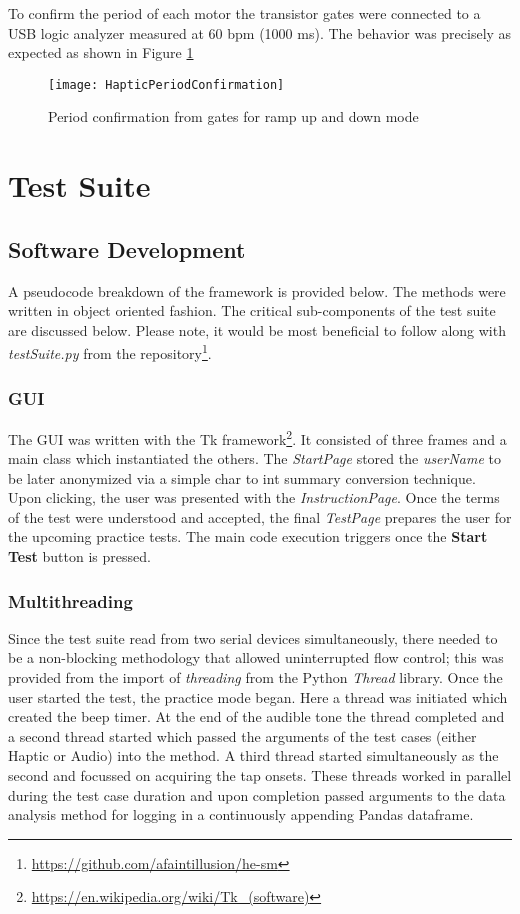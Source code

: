 To confirm the period of each motor the transistor gates were connected to a USB logic analyzer measured at 60 bpm (1000 ms). The behavior was precisely as expected as shown in Figure \ref{fig:HPC}
\begin{figure}[H]
    \centering
    \texttt{[image: HapticPeriodConfirmation]}
    \caption{Period confirmation from gates for ramp up and down mode}
    \label{fig:HPC}
\end{figure}

\chapter{Test Suite}
\section{Software Development} \label{development}
A pseudocode breakdown of the framework is provided below. The methods were written in object oriented fashion. The critical sub-components of the test suite are discussed below. Please note, it would be most beneficial to follow along with \textit{testSuite.py} from the repository\footnote{\url{https://github.com/afaintillusion/he-sm}}.

\subsection{GUI}
The GUI was written with the Tk framework\footnote{\url{https://en.wikipedia.org/wiki/Tk_(software)}}. It consisted of three frames and a main class which instantiated the others. The \textit{StartPage} stored the \textit{userName} to be later anonymized via a simple char to int summary conversion technique. Upon clicking, the user was presented with the \textit{InstructionPage}. Once the terms of the test were understood and accepted, the final \textit{TestPage} prepares the user for the upcoming practice tests. The main code execution triggers once the \textbf{Start Test} button is pressed.
\subsection{Multithreading}
Since the test suite read from two serial devices simultaneously, there needed to be a non-blocking methodology that allowed uninterrupted flow control; this was provided from the import of \textit{threading} from the Python \textit{Thread} library. Once the user started the test, the practice mode began. Here a thread was initiated which created the beep timer. At the end of the audible tone the thread completed and a second thread started which passed the arguments of the test cases (either Haptic or Audio) into the method. A third thread started simultaneously as the second and focussed on acquiring the tap onsets. These threads worked in parallel during the test case duration and upon completion passed arguments to the data analysis method for logging in a continuously appending Pandas dataframe.
